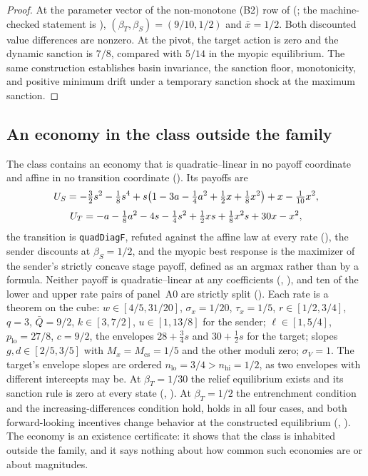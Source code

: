 \begin{proof}
At the parameter vector of the non-monotone (B2) row of
 (; the machine-checked statement is
),
$(\beta_T,\beta_S)=(9/10,1/2)$ and $\bar x=1/2$. Both discounted value
differences are nonzero. At the pivot, the target action is zero and the
dynamic sanction is $7/8$, compared with $5/14$ in the myopic
equilibrium. The same construction establishes basin invariance, the
sanction floor, monotonicity, and positive minimum drift under a
temporary sanction shock at the maximum sanction.
\end{proof}

\subsection{An economy in the class outside the family}
\label{app:witness:quartic}
The class contains an economy that is
quadratic--linear in no payoff coordinate and affine in no transition
coordinate (). Its payoffs are
\[
U_S=-\tfrac32s^2-\tfrac18s^4+s\bigl(1-3a-\tfrac14a^2+\tfrac12x+\tfrac18x^2\bigr)+x-\tfrac1{10}x^2,
\]
\[
U_T=-a-\tfrac18a^2-4s-\tfrac14s^2+\tfrac12xs+\tfrac18x^2s+30x-x^2,
\]
the transition is \texttt{quadDiagF}, refuted against the affine law at every
rate (), the sender discounts at $\beta_S=1/2$, and the
myopic best response is the maximizer of the sender's strictly concave stage payoff,
defined as an argmax rather than by a formula. Neither payoff is
quadratic--linear at any coefficients (,
), and ten of the lower and upper rate pairs of panel~A0
are strictly split (). Each rate is a
theorem on the cube: $w\in[4/5,31/20]$, $\sigma_x=1/20$, $\tau_x=1/5$,
$r\in[1/2,3/4]$, $q=3$, $\bar Q=9/2$, $k\in[3,7/2]$, $u\in[1,13/8]$ for the
sender; $\ell\in[1,5/4]$, $p_{\mathrm{lo}}=27/8$, $c=9/2$, the envelopes
$28+\tfrac34s$ and $30+\tfrac12s$ for the target; slopes
$g,d\in[2/5,3/5]$ with $M_x=M_{\mathrm{cs}}=1/5$ and the other moduli zero;
$\sigma_V=1$. The target's envelope slopes are ordered
$n_{\mathrm{lo}}=3/4>n_{\mathrm{hi}}=1/2$, as two envelopes with different
intercepts may be. At $\beta_T=1/30$ the relief equilibrium exists and its
sanction rule is zero at every state (,
). At $\beta_T=1/2$ the entrenchment condition and the increasing-differences
condition hold,  holds in all four cases, and both forward-looking
incentives change behavior at the constructed equilibrium
(, ). The economy is
an existence certificate: it shows that the class is inhabited outside the
family, and it says nothing about how common such economies are or about
magnitudes.

